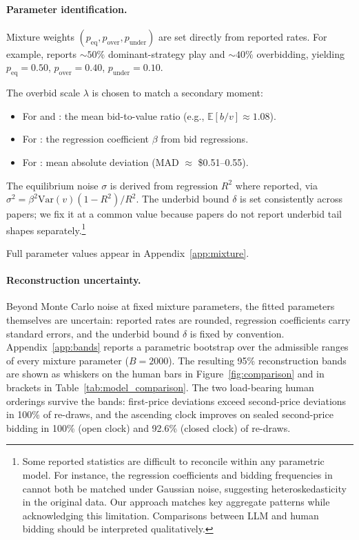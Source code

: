 \documentclass{article} %
\newif\ifmarkrev
\newcommand{\rev}[1]{\ifmarkrev\begingroup\color{red}#1\endgroup\else#1\fi}
\begin{document}
\paragraph{Parameter identification.}
Mixture weights $(p_{\text{eq}}, p_{\text{over}}, p_{\text{under}})$ are set directly from reported rates. For example, \citet{li2017obviously} reports ${\sim}50\%$ dominant-strategy
play and ${\sim}40\%$ overbidding, yielding $p_{\text{eq}} = 0.50$, $p_{\text{over}} = 0.40$, $p_{\text{under}} = 0.10$.

The overbid scale $\lambda$ is chosen to match a secondary moment:
\begin{itemize}
  \item For \citet{li2017obviously} and \citet{breitmoser2022obviousness}: the mean bid-to-value ratio (e.g., $\mathbb{E}[b/v] \approx 1.08$).
  \item For \citet{kagel1993independent}: the regression coefficient $\beta$ from bid regressions.
  \item For \citet{gonczarowski2023strategyproofness}: mean absolute deviation (MAD $\approx$ \$0.51--0.55).
\end{itemize}
The equilibrium noise $\sigma$ is derived from regression $R^2$ where reported, via $\sigma^2 = \beta^2 \text{Var}(v)(1-R^2)/R^2$. The underbid bound $\delta$ is set consistently across
papers; we fix it at a common value because papers do not report underbid tail shapes separately.\rev{\footnote{Some reported statistics are difficult to reconcile within any parametric model. For instance, the regression coefficients and bidding frequencies in \citet{kagel1993independent} cannot both be matched under Gaussian noise, suggesting heteroskedasticity in the original data. Our approach matches key aggregate patterns while acknowledging this limitation. Comparisons between LLM and human bidding should be interpreted qualitatively.}}

Full parameter values appear in Appendix~\ref{app:mixture}.

\paragraph{\rev{Reconstruction uncertainty.}}
\rev{Beyond Monte Carlo noise at fixed mixture parameters, the fitted parameters themselves are uncertain: reported rates are rounded, regression coefficients carry standard errors, and the underbid bound $\delta$ is fixed by convention. Appendix~\ref{app:bands} reports a parametric bootstrap over the admissible ranges of every mixture parameter ($B=2000$). The resulting 95\% reconstruction bands are shown as whiskers on the human bars in Figure~\ref{fig:comparison} and in brackets in Table~\ref{tab:model_comparison}. The two load-bearing human orderings survive the bands: first-price deviations exceed second-price deviations in 100\% of re-draws, and the ascending clock improves on sealed second-price bidding in 100\% (open clock) and 92.6\% (closed clock) of re-draws.}
\end{document}
